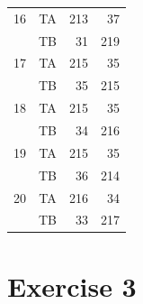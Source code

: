 \documentclass[a4paper,11pt]{article}
\begin{document}
\begin{table}
\begin{tabular}{lcrr}
 16 & TA & 213 &    37 \\
& TB &  31 &   219 \\
 17 & TA & 215 &    35 \\
& TB &  35 &   215 \\
 18 & TA & 215 &    35 \\
& TB &  34 &   216 \\
 19 & TA & 215 &    35 \\
& TB &  36 &   214 \\
 20 & TA & 216 &    34 \\
& TB &  33 &   217 \\
\end{tabular}
\end{table}

\section*{Exercise 3}
\end{document}
